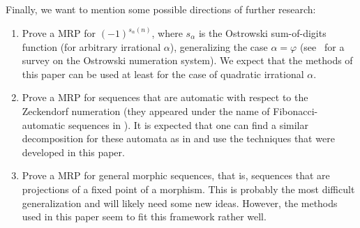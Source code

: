 \documentclass[12pt]{amsart}
\begin{document}
Finally, we want to mention some possible directions of further research:
\begin{enumerate}
\item Prove a MRP for $(-1)^{s_\alpha(n)}$, where $s_\alpha$ is the Ostrowski sum-of-digits function (for arbitrary irrational $\alpha$), 
generalizing the case $\alpha=\varphi$ (see~\cite{Berthe2001} for a survey on the Ostrowski numeration system). 
We expect that the methods of this paper can be used at least for the case of quadratic irrational $\alpha$.
\item Prove a MRP for sequences that are automatic with respect to the Zeckendorf numeration (they appeared under the name of Fibonacci-automatic sequences in \cite{fibonacci_automatic}).
It is expected that one can find a similar decomposition for these automata as in \cite{Muellner2017} and use the techniques that were developed in this paper.
\item Prove a MRP for general morphic sequences, that is, sequences that are projections of a fixed point of a morphism.
	This is probably the most difficult generalization and will likely need some new ideas.
	However, the methods used in this paper seem to fit this framework rather well.

\end{enumerate}



\end{document}
